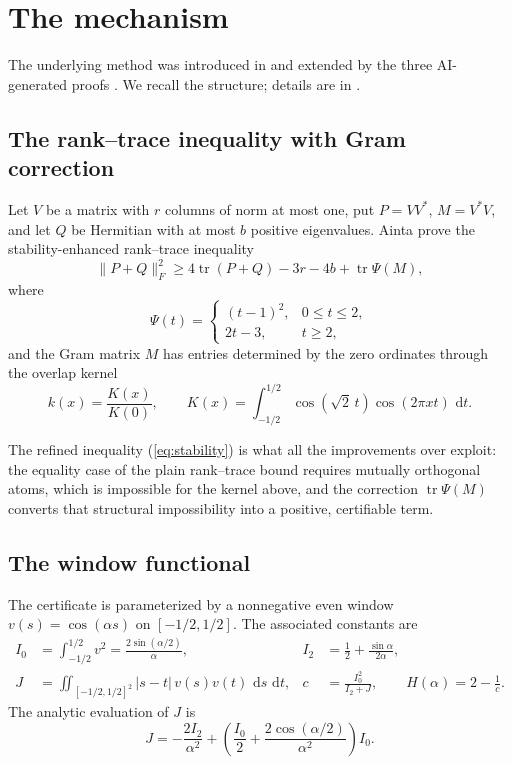 \documentclass[11pt]{article}
\newcommand{\tr}{\operatorname{tr}}
\newcommand{\dd}{\,\mathrm{d}}
\begin{document}
\section{The mechanism}
\label{sec:mechanism}

The underlying method was introduced in \cite{claude2026} and extended by the
three AI-generated proofs \cite{ainta,trmdy,tawanerguo}.  We recall the
structure; details are in \cite{ainta}.

\subsection{The rank--trace inequality with Gram correction}
\label{sec:rank-trace}

Let $V$ be a matrix with $r$ columns of norm at most one, put
$P=VV^*$, $M=V^*V$, and let $Q$ be Hermitian with at most $b$ positive
eigenvalues.  Ainta \cite{ainta} prove the stability-enhanced rank--trace
inequality
\begin{equation}
 \|P+Q\|_F^2 \ge 4\tr(P+Q) - 3r - 4b + \tr\Psi(M),
 \label{eq:stability}
\end{equation}
where
\[
 \Psi(t)=\begin{cases}(t-1)^2,&0\le t\le 2,\\ 2t-3,&t\ge 2,\end{cases}
\]
and the Gram matrix $M$ has entries determined by the zero ordinates through
the overlap kernel
\[
 k(x)=\frac{K(x)}{K(0)},\qquad
 K(x)=\int_{-1/2}^{1/2}\cos(\sqrt2\,t)\cos(2\pi x t)\,\dd t.
\]

The refined inequality (\ref{eq:stability}) is what all the improvements over
\cite{claude2026} exploit: the equality case of the plain rank--trace bound
requires mutually orthogonal atoms, which is impossible for the kernel above,
and the correction $\tr\Psi(M)$ converts that structural impossibility into a
positive, certifiable term.

\subsection{The window functional}
\label{sec:window}

The certificate is parameterized by a nonnegative even window
$v(s)=\cos(\alpha s)$ on $[-1/2,1/2]$.  The associated constants are
\begin{align}
 I_0 &= \int_{-1/2}^{1/2} v^2 = \frac{2\sin(\alpha/2)}{\alpha}, &
 I_2 &= \frac12+\frac{\sin\alpha}{2\alpha},\\
 J &= \iint_{[-1/2,1/2]^2} |s-t|\,v(s)v(t)\,\dd s\,\dd t, &
 c &= \frac{I_0^2}{I_2+J},\qquad
 H(\alpha) = 2 - \frac1c .
\end{align}
The analytic evaluation of $J$ is
\begin{equation}
 J = -\frac{2I_2}{\alpha^2} + \left(\frac{I_0}{2}+\frac{2\cos(\alpha/2)}{\alpha^2}\right)I_0 .
 \label{eq:J}
\end{equation}
\end{document}
